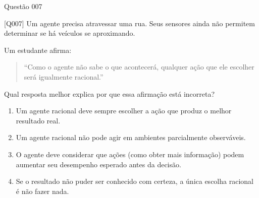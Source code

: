 \documentclass[xcolor=dvipsnames,table]{beamer}
\begin{document}
	\begin{frame}{Questão 007}

		\small

    \begin{block}{[Q007]}
        Um agente precisa atravessar uma rua. Seus sensores ainda não
        permitem determinar se há veículos se aproximando.

        Um estudante afirma:

        \begin{quote}
        ``Como o agente não sabe o que acontecerá, qualquer ação que ele
        escolher será igualmente racional.''
        \end{quote}

        Qual resposta melhor explica por que essa afirmação está incorreta?
    \end{block}

    \begin{enumerate}[label=(\Alph*)]

        \item Um agente racional deve sempre escolher a ação que produz
        o melhor resultado real.

        \item Um agente racional não pode agir em ambientes parcialmente
        observáveis.

        \item O agente deve considerar que ações (como obter mais informação) podem aumentar seu desempenho esperado antes da decisão.

        \item Se o resultado não puder ser conhecido com certeza, a única
        escolha racional é não fazer nada.

    \end{enumerate}

\end{frame}

	
	
	\begin{frame}
		\titlepage
	\end{frame}
	
\end{document}
